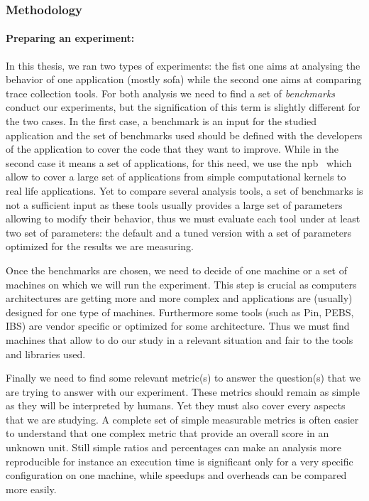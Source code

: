 \subsubsection{Methodology}

\paragraph{Preparing an experiment:}

In this thesis, we ran two types of experiments: the fist one aims at
analysing the behavior of one application (mostly \Gls{sofa}) while the second
one aims at comparing trace collection tools. For both analysis we need to
find a set of \emph{benchmarks} conduct our experiments, but the signification
of this term is slightly different for the two cases. In the first case, a
benchmark is an input for the studied application and the set of benchmarks
used should be defined with the developers of the application to cover the
code that they want to improve. While in the second case it means a set of
applications, for this need, we use the \gls{npb}~\cite{Jin1999} which allow
to cover a large set of applications from simple computational kernels to real
life applications. Yet to compare several analysis tools, a set of benchmarks
is not a sufficient input as these tools usually provides a large set of
parameters allowing to modify their behavior, thus we must evaluate each tool
under at least two set of parameters: the default and a tuned version with a
set of parameters optimized for the results we are measuring.

Once the benchmarks are chosen, we need to decide of one machine or a set of
machines on which we will run the experiment. This step is crucial as
computers architectures are getting more and more complex  and applications are (usually) designed for one type of machines.
Furthermore some tools (such as \gls{Pin}, \gls{PEBS}, \gls{IBS}) are vendor
specific or optimized for some architecture. Thus we must find machines that
allow to do our study in a relevant situation and fair to the tools and
libraries used.

Finally we need to find some relevant metric(s) to answer the question(s) that we
are trying to answer with our experiment. These metrics should remain as
simple as they will be interpreted by humans. Yet they must also cover every
aspects that we are studying. A complete set of simple measurable metrics is
often easier to understand that one complex metric that provide an overall
score in an unknown unit. Still simple ratios and percentages can make an
analysis more reproducible for instance an execution time is significant only
for a very specific configuration on one machine, while speedups and overheads
can be compared more easily.


